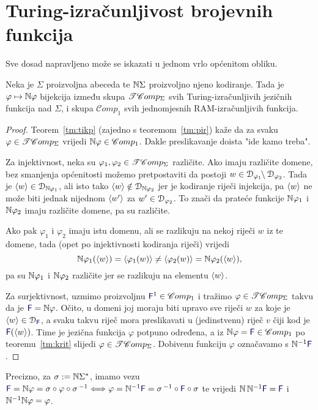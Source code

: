 \section{Turing-izračunljivost brojevnih funkcija}


Sve dosad napravljeno može se iskazati u jednom vrlo općenitom obliku.

\begin{propozicija}[{name=[izomorfizam skupova $\TComp$ i $\mathscr Comp_1$]}]\label{pp:trackbij}
Neka je $\Sigma$ proizvoljna abeceda te ${\mathbb N}\Sigma$ proizvoljno njeno kodiranje. Tada je $\varphi\mapsto{\mathbb N}\varphi$ bijekcija između skupa $\TComp$ svih Turing-izračunljivih jezičnih funkcija nad $\Sigma$, i skupa $\mathscr Comp_1$ svih jednomjesnih RAM-izračunljivih funkcija.
\end{propozicija}

\begin{proof}
Teorem~\ref{tm:tikp} (zajedno s teoremom~\ref{tm:pir}) kaže da za svaku $\varphi\in\mathscr{TC}omp_\Sigma$ vrijedi ${\mathbb N}\varphi\in\mathscr Comp_1$. Dakle preslikavanje doista "ide kamo treba".

Za injektivnost, neka su $\varphi_1,\varphi_2\in\mathscr{TC}omp_\Sigma$ različite. Ako imaju različite domene, bez smanjenja općenitosti možemo pretpostaviti da postoji $w\in\mathcal D_{\varphi_1}\!\!\setminus\mathcal D_{\varphi_2}$. Tada je $\langle w\rangle\in\mathcal D_{{\mathbb N}\varphi_1}$, ali isto tako $\langle w\rangle\notin\mathcal D_{{\mathbb N}\varphi_2}$ jer je kodiranje riječi injekcija, pa $\langle w\rangle$ ne može biti jednak nijednom $\langle w'\rangle$ za $w'\in\mathcal D_{\varphi_2}$. To znači da prateće funkcije ${\mathbb N}\varphi_1$ i ${\mathbb N}\varphi_2$ imaju različite domene, pa su različite.

Ako pak $\varphi_1$ i $\varphi_2$ imaju istu domenu, ali se razlikuju na nekoj riječi $w$ iz te domene, tada (opet po injektivnosti kodiranja riječi) vrijedi
\begin{equation}
    {\mathbb N}\varphi_1(\langle w\rangle)=\langle\varphi_1(w)\rangle\ne\langle\varphi_2(w)\rangle={\mathbb N}\varphi_2(\langle w\rangle)\text,
\end{equation}
pa su ${\mathbb N}\varphi_1$ i ${\mathbb N}\varphi_2$ različite jer se razlikuju na elementu $\langle w\rangle$.

Za surjektivnost, uzmimo proizvoljnu $\f F^1\in\mathscr Comp_1$ i tražimo $\varphi\in\mathscr{TC}omp_\Sigma$ takvu da je $\f F=\N\varphi$. Očito, u domeni joj moraju biti upravo sve riječi $w$ za koje je $\kr w\in\dom{\f F}$, a svaku takvu riječ mora preslikavati u (jedinstvenu) riječ $v$ čiji kod je $\f F(\kr w)$. Time je jezična funkcija $\varphi$ potpuno određena, a iz $\N\varphi=\f F\in\mathscr Comp_1$ po teoremu~\ref{tm:krit} slijedi $\varphi\in\mathscr{TC}omp_\Sigma$. Dobivenu funkciju $\varphi$ označavamo s $\N^{-1}\f F$.
\end{proof}
Precizno, za $\sigma:={\mathbb N}\Sigma^*$, imamo vezu
	$\f F=\N\varphi=\sigma\circ\varphi\circ\sigma^{\,-1}\Longleftrightarrow
	\varphi=\N^{-1}\f F=\sigma^{\,-1}\circ\f F\circ\sigma$
te vrijedi $\N\,\N^{-1}\f F=\f F$ i ${\mathbb N}^{-1}{\mathbb N}\varphi=\varphi$.

